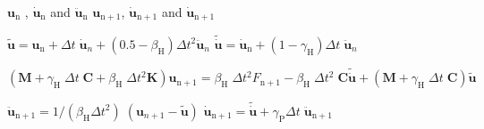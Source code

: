 \begin{algorithm}
\caption{General Newmark Effective Stiffness Formulation} \label{alg:NewmarkEFFSTIFF}
\begin{algorithmic}
\REQUIRE $\mathbf{u}_{\mathrm{n}}$ , $\mathbf{\dot{u}}_{\mathrm{n}}$ and $\mathbf{\ddot{u}}_{\mathrm{n}}$
\ENSURE $\mathbf{u}_{\mathrm{n}+1}$, $\mathbf{\dot{u}}_{\mathrm{n}+1}$ and $\mathbf{\dot{u}}_{\mathrm{n}+1}$

\STATE {}
\STATE $\tilde{\mathbf{u}} = \mathbf{u}_{\mathrm{n}} + \Delta t\;\mathbf{\dot{u}}_{n}+ (0.5-\beta_{\mathrm{H}}) \Delta
t^2 \mathbf{\ddot{u}}_{n}$
\STATE $\mathbf{\tilde{\dot{u}}} = \mathbf{\dot{u}}_{\mathrm{n}} + (1-\gamma_\mathrm{H}) \Delta t \; \mathbf{\ddot{u}}_{n}$

\STATE {}
\STATE $\left( \mathbf{M} + \gamma_{\mathrm{H}}\; \Delta t\; \mathbf{C} + \beta_{\mathrm{H}}\; \Delta t^2 \mathbf{K}
\right) \mathbf{u}_{\mathrm{n}+1} = \beta_{\mathrm{H}}\; \Delta t^2 F_{\mathrm{n}+1} -\beta_{\mathrm{H}}\; \Delta t^2\;
\mathbf{C} \mathbf{\tilde{\dot{u}}} + \left(\mathbf{M} + \gamma_{\mathrm{H}}\; \Delta t\; \mathbf{C} \right) \tilde{\mathbf{u}} $

\STATE {}
\STATE $\mathbf{\ddot{u}}_{\mathrm{n}+1} = 1/(\beta_{\mathrm{H}}\Delta t^2) \; \left(\mathbf{u}_{n+1} - \tilde{\mathbf{u}}\right)$
\STATE $\mathbf{\dot{u}}_{\mathrm{n}+1} = \mathbf{\tilde{\dot{u}}} + \gamma_{\mathrm{P}}\Delta t\;\mathbf{\ddot{u}}_{\mathrm{n}+1} $
\end{algorithmic}
\end{algorithm}



